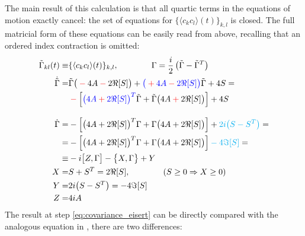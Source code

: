 \documentclass[a4paper,11pt]{article}
\theoremstyle{remark}
\newcommand{\mean}[1]{\ensuremath{\langle #1 \rangle}}
\newcommand*{\mathcolor}{}  %
\def\mathcolor#1#{\mathcoloraux{#1}}
\newcommand*{\mathcoloraux}[3]{%
  \protect\leavevmode
  \begingroup
    \color#1{#2}#3%
  \endgroup
}
\begin{document}
   The main result of this calculation is that all quartic terms in the equations of motion exactly cancel: the set of equations for $\{\mean{c_kc_l}(t)\}_{k,l}$ is closed. The full matricial form of these equations can be easily read from above, recalling that an ordered index contraction is omitted:
   \begin{subequations}
   \label{eq:covariance_qme}
   \begin{align}
    \tilde{\Gamma}_{kl}(t) \equiv & \{\mean{c_kc_l}(t)\}_{k,l},\quad\quad\quad\quad \Gamma = \frac{i}{2}\left(\tilde{\Gamma}-\tilde{\Gamma}^T\right) \notag\\
    \dot{\tilde{\Gamma}} =&\tilde{\Gamma}\big(\mathcolor{red}{-}4A\mathcolor{red}{-}2\Re[S]\big) + \mathcolor{blue}{\big(\mathcolor{red}{+}4A\mathcolor{red}{-}2\Re[S]\big)}\tilde{\Gamma} + 4S=\notag\\ &\mathcolor{red}{-}\left[\mathcolor{blue}{\big(4A\mathcolor{red}{+}2\Re[S]\big)^{T}}\tilde{\Gamma}+\tilde{\Gamma}\big(4A\mathcolor{red}{+}2\Re[S]\big)\right] +4S  \notag\\[0.3cm]
    \dot{\Gamma}=& -\left[\big(4A+2\Re[S]\big)^{T}\Gamma+\Gamma\big(4A+2\Re[S]\big)\right]+\mathcolor{cyan}{2i\big(S-S^T\big)}=\notag\\
                =& -\left[\big(4A+2\Re[S]\big)^{T}\Gamma+\Gamma\big(4A+2\Re[S]\big)\right]\mathcolor{cyan}{-4\Im[S]}=\label{eq:covariance_eisert}\\
                \equiv& -i\big[Z,\Gamma\big] - \big\{X,\Gamma\big\}+Y\label{eq:covariance_qme_compact}\\
    X =& S+S^T = 2\Re[S], \quad\quad\quad\quad (S\geq 0\Rightarrow X\geq 0) \notag\\
    Y =& 2i\big(S-S^T\big) = -4\Im[S] \notag \\
    Z =& 4iA \notag
   \end{align}
   \end{subequations}
   The result at step \eqref{eq:covariance_eisert} can be directly compared with the analogous equation in \cite{Eisert2010}, there are two differences: 
\end{document}
